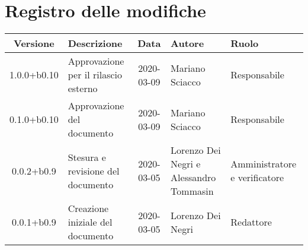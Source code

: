 \section*{Registro delle modifiche}

\begin{center}
	\begin{longtable}{|c|p{3.5cm}|c|p{3cm}|p{3cm}|}
	\hline
	\rowcolor{lighter-grayer}
	\textbf{Versione} & \textbf{Descrizione} & \textbf{Data} & \textbf{Autore} & \textbf{Ruolo} \\
	\hline
	\endfirsthead


	1.0.0+b0.10 & Approvazione per il rilascio esterno & 2020-03-09 & Mariano Sciacco & Responsabile \\
	\hline
	0.1.0+b0.10 & Approvazione del documento & 2020-03-09 & Mariano Sciacco & Responsabile \\
	\hline
	0.0.2+b0.9 & Stesura e revisione del documento & 2020-03-05 & Lorenzo Dei Negri e Alessandro Tommasin & Amministratore e verificatore \\
	\hline
	0.0.1+b0.9 & Creazione iniziale del documento & 2020-03-05 & Lorenzo Dei Negri & Redattore \\
	\hline

	\end{longtable}
\end{center}